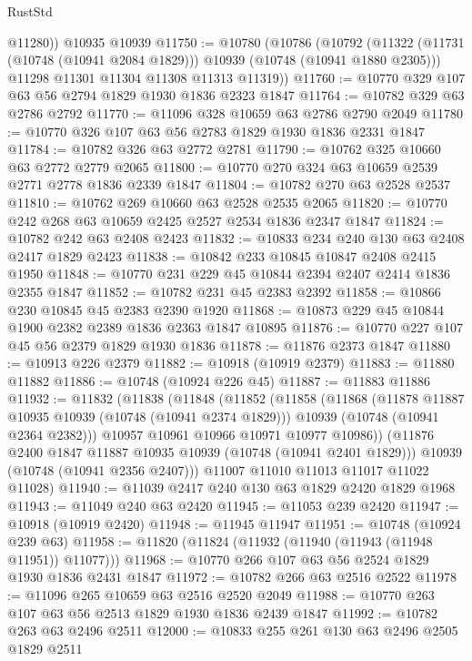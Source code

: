\begin{lexlean}{RustStd}
\begin{coremodule}
        @11280))
    @10935
    @10939
@11750 := @10780
    (@10786
      (@10792
        (@11322 (@11731 (@10748 (@10941 @2084 @1829))) @10939 (@10748 (@10941 @1880 @2305)))
        @11298
        @11301
        @11304
        @11308
        @11313
        @11319))
@11760 := @10770 @329 @107 @63 @56 @2794 @1829 @1930 @1836 @2323 @1847
@11764 := @10782 @329 @63 @2786 @2792
@11770 := @11096 @328 @10659 @63 @2786 @2790 @2049
@11780 := @10770 @326 @107 @63 @56 @2783 @1829 @1930 @1836 @2331 @1847
@11784 := @10782 @326 @63 @2772 @2781
@11790 := @10762 @325 @10660 @63 @2772 @2779 @2065
@11800 := @10770 @270 @324 @63 @10659 @2539 @2771 @2778 @1836 @2339 @1847
@11804 := @10782 @270 @63 @2528 @2537
@11810 := @10762 @269 @10660 @63 @2528 @2535 @2065
@11820 := @10770 @242 @268 @63 @10659 @2425 @2527 @2534 @1836 @2347 @1847
@11824 := @10782 @242 @63 @2408 @2423
@11832 := @10833 @234 @240 @130 @63 @2408 @2417 @1829 @2423
@11838 := @10842 @233 @10845 @10847 @2408 @2415 @1950
@11848 := @10770 @231 @229 @45 @10844 @2394 @2407 @2414 @1836 @2355 @1847
@11852 := @10782 @231 @45 @2383 @2392
@11858 := @10866 @230 @10845 @45 @2383 @2390 @1920
@11868 := @10873 @229 @45 @10844 @1900 @2382 @2389 @1836 @2363 @1847 @10895
@11876 := @10770 @227 @107 @45 @56 @2379 @1829 @1930 @1836
@11878 := @11876 @2373 @1847
@11880 := @10913 @226 @2379
@11882 := @10918 (@10919 @2379)
@11883 := @11880 @11882
@11886 := @10748 (@10924 @226 @45)
@11887 := @11883 @11886
@11932 := @11832
    (@11838
      (@11848
        (@11852
          (@11858
            (@11868
              (@11878 @11887 @10935 @10939 (@10748 (@10941 @2374 @1829)))
              @10939
              (@10748 (@10941 @2364 @2382)))
            @10957
            @10961
            @10966
            @10971
            @10977
            @10986))
        (@11876 @2400 @1847 @11887 @10935 @10939 (@10748 (@10941 @2401 @1829)))
        @10939
        (@10748 (@10941 @2356 @2407)))
      @11007
      @11010
      @11013
      @11017
      @11022
      @11028)
@11940 := @11039 @2417 @240 @130 @63 @1829 @2420 @1829 @1968
@11943 := @11049 @240 @63 @2420
@11945 := @11053 @239 @2420
@11947 := @10918 (@10919 @2420)
@11948 := @11945 @11947
@11951 := @10748 (@10924 @239 @63)
@11958 := @11820 (@11824 (@11932 (@11940 (@11943 (@11948 @11951)) @11077)))
@11968 := @10770 @266 @107 @63 @56 @2524 @1829 @1930 @1836 @2431 @1847
@11972 := @10782 @266 @63 @2516 @2522
@11978 := @11096 @265 @10659 @63 @2516 @2520 @2049
@11988 := @10770 @263 @107 @63 @56 @2513 @1829 @1930 @1836 @2439 @1847
@11992 := @10782 @263 @63 @2496 @2511
@12000 := @10833 @255 @261 @130 @63 @2496 @2505 @1829 @2511

\end{coremodule}
\end{lexlean}
